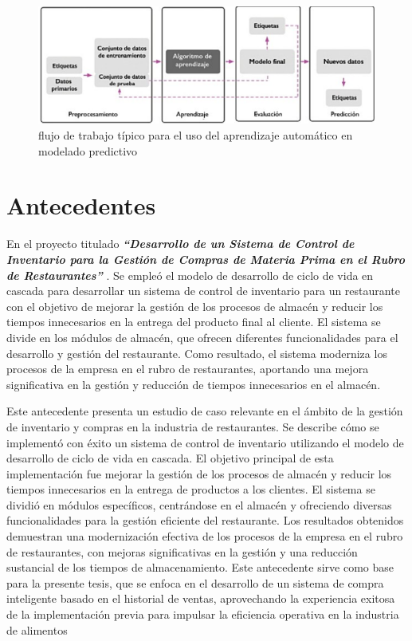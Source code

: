 \begin{figure}[H]
  \begin{center}
    \includegraphics[scale=0.90]{./uso_aprendisaje_automatico.png}
    \caption{ flujo de trabajo típico para el uso del aprendizaje automático en
    modelado predictivo}
    \label{fig:perceptron}
  \end{center}
\end{figure}

\section{Antecedentes}
En el proyecto titulado \textbf{\textit{“Desarrollo de un Sistema de Control de Inventario para la Gestión de Compras de Materia Prima en el Rubro de Restaurantes”}} \cite{condorena2017desarrollo}. Se empleó el modelo de desarrollo de ciclo de vida en cascada para desarrollar un sistema de control de inventario para un restaurante con el objetivo de mejorar la gestión de los procesos de almacén y reducir los tiempos innecesarios en la entrega del producto final al cliente. El sistema se divide en los módulos de almacén, que ofrecen diferentes funcionalidades para el desarrollo y gestión del restaurante. Como resultado, el sistema moderniza los procesos de la empresa en el rubro de restaurantes, aportando una mejora significativa en la gestión y reducción de tiempos innecesarios en el almacén. 

\vspace{1\baselineskip}
Este antecedente presenta un estudio de caso relevante en el ámbito de la gestión de inventario y compras en la industria de restaurantes. Se describe cómo se implementó con éxito un sistema de control de inventario utilizando el modelo de desarrollo de ciclo de vida en cascada. El objetivo principal de esta implementación fue mejorar la gestión de los procesos de almacén y reducir los tiempos innecesarios en la entrega de productos a los clientes. El sistema se dividió en módulos específicos, centrándose en el almacén y ofreciendo diversas funcionalidades para la gestión eficiente del restaurante. Los resultados obtenidos demuestran una modernización efectiva de los procesos de la empresa en el rubro de restaurantes, con mejoras significativas en la gestión y una reducción sustancial de los tiempos de almacenamiento. Este antecedente sirve como base para la presente tesis, que se enfoca en el desarrollo de un sistema de compra inteligente basado en el historial de ventas, aprovechando la experiencia exitosa de la implementación previa para impulsar la eficiencia operativa en la industria de alimentos

